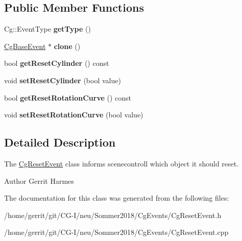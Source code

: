 \subsection*{Public Member Functions}
\begin{DoxyCompactItemize}
\item 
\mbox{\label{class_cg_reset_event_a41a05386db37735a992c5623a24dcc27}} 
Cg\+::\+Event\+Type {\bfseries get\+Type} ()
\item 
\mbox{\label{class_cg_reset_event_a72eae11360cf70f1395c7096e5f8b8e6}} 
\hyperlink{class_cg_base_event}{Cg\+Base\+Event} $\ast$ {\bfseries clone} ()
\item 
\mbox{\label{class_cg_reset_event_adfcd49a39f19e7c74f0f8917f7e0de32}} 
bool {\bfseries get\+Reset\+Cylinder} () const
\item 
\mbox{\label{class_cg_reset_event_aa648fde0530a92a2189f117e42d6c6f7}} 
void {\bfseries set\+Reset\+Cylinder} (bool value)
\item 
\mbox{\label{class_cg_reset_event_a65a6d74c99850f710bce95ca35d4d957}} 
bool {\bfseries get\+Reset\+Rotation\+Curve} () const
\item 
\mbox{\label{class_cg_reset_event_a3eb1feffb6f1e1f4f4b3c503904af599}} 
void {\bfseries set\+Reset\+Rotation\+Curve} (bool value)
\end{DoxyCompactItemize}


\subsection{Detailed Description}
The \hyperlink{class_cg_reset_event}{Cg\+Reset\+Event} class informs scenecontroll which object it should reset. 

\begin{DoxyAuthor}{Author}
Gerrit Harmes 
\end{DoxyAuthor}


The documentation for this class was generated from the following files\+:\begin{DoxyCompactItemize}
\item 
/home/gerrit/git/\+C\+G-\/\+I/neu/\+Sommer2018/\+Cg\+Events/Cg\+Reset\+Event.\+h\item 
/home/gerrit/git/\+C\+G-\/\+I/neu/\+Sommer2018/\+Cg\+Events/Cg\+Reset\+Event.\+cpp\end{DoxyCompactItemize}
